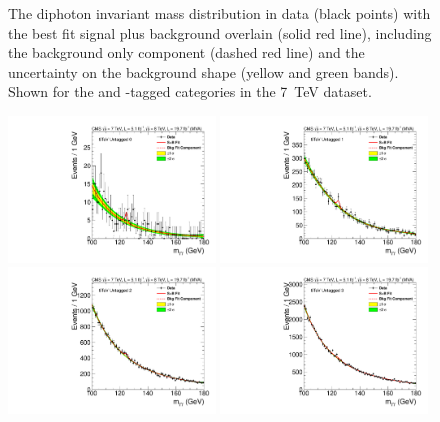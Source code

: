 \begin{figure}
  \caption[The diphoton invariant mass distribution in data with the best fit signal plus background overlain for the \acs{VH} and \acs{ttH}-tagged categories in the 8~TeV dataset.]{The diphoton invariant mass distribution in data (black points) with the best fit signal plus background overlain (solid red line), including the background only component (dashed red line) and the uncertainty on the background shape (yellow and green bands). Shown for the \VH and \ttH-tagged categories in the 7~TeV dataset.}
  \label{fig:bfres2}
\end{figure}

\begin{figure}
  \vspace{-1cm}
  \includegraphics[width=0.49\textwidth]{results/plots/mgg-cats/mgg_mva_nosub_ch2_cat0_8TeV.pdf}
  \includegraphics[width=0.49\textwidth]{results/plots/mgg-cats/mgg_mva_nosub_ch2_cat1_8TeV.pdf}
  \includegraphics[width=0.49\textwidth]{results/plots/mgg-cats/mgg_mva_nosub_ch2_cat2_8TeV.pdf}
  \includegraphics[width=0.49\textwidth]{results/plots/mgg-cats/mgg_mva_nosub_ch2_cat3_8TeV.pdf}

\end{figure}
